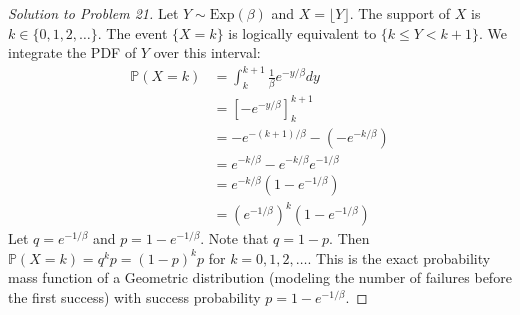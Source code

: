 \documentclass[11pt, a4paper]{article}
\theoremstyle{definition}
\theoremstyle{remark}
\newcommand{\Prob}{\mathbb{P}}
\begin{document}
\begin{proof}[Solution to Problem 21]
Let $Y \sim \text{Exp}(\beta)$ and $X = \lfloor Y \rfloor$. The support of $X$ is $k \in \{0, 1, 2, \dots\}$.
The event $\{X = k\}$ is logically equivalent to $\{k \le Y < k+1\}$.
We integrate the PDF of $Y$ over this interval:
\begin{align*}
\Prob(X = k) &= \int_k^{k+1} \frac{1}{\beta} e^{-y/\beta} dy \\
&= \left[ -e^{-y/\beta} \right]_k^{k+1} \\
&= -e^{-(k+1)/\beta} - (-e^{-k/\beta}) \\
&= e^{-k/\beta} - e^{-k/\beta} e^{-1/\beta} \\
&= e^{-k/\beta} (1 - e^{-1/\beta}) \\
&= (e^{-1/\beta})^k (1 - e^{-1/\beta})
\end{align*}
Let $q = e^{-1/\beta}$ and $p = 1 - e^{-1/\beta}$. Note that $q = 1 - p$.
Then $\Prob(X = k) = q^k p = (1-p)^k p$ for $k = 0, 1, 2, \dots$.
This is the exact probability mass function of a Geometric distribution (modeling the number of failures before the first success) with success probability $p = 1 - e^{-1/\beta}$.
\end{proof}
\end{document}
